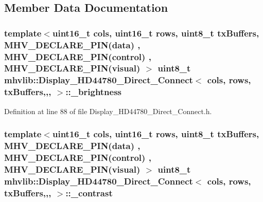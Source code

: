 \subsection{Member Data Documentation}
\hypertarget{classmhvlib_1_1_display___h_d44780___direct___connect_aba2e5cf89a0de2c24ee7a6dd1d5a9069}{
\subsubsection[{\-\_\-brightness}]{\setlength{\rightskip}{0pt plus 5cm}template$<$uint16\-\_\-t cols, uint16\-\_\-t rows, uint8\-\_\-t tx\-Buffers, M\-H\-V\-\_\-\-D\-E\-C\-L\-A\-R\-E\-\_\-\-P\-I\-N(data) , M\-H\-V\-\_\-\-D\-E\-C\-L\-A\-R\-E\-\_\-\-P\-I\-N(control) , M\-H\-V\-\_\-\-D\-E\-C\-L\-A\-R\-E\-\_\-\-P\-I\-N(visual) $>$ uint8\-\_\-t {\bf mhvlib\-::\-Display\-\_\-\-H\-D44780\-\_\-\-Direct\-\_\-\-Connect}$<$ cols, rows, tx\-Buffers,,, $>$\-::\-\_\-brightness\hspace{0.3cm}{\ttfamily [protected]}}}\label{classmhvlib_1_1_display___h_d44780___direct___connect_aba2e5cf89a0de2c24ee7a6dd1d5a9069}


Definition at line 88 of file Display\-\_\-\-H\-D44780\-\_\-\-Direct\-\_\-\-Connect.\-h.

\hypertarget{classmhvlib_1_1_display___h_d44780___direct___connect_a1872f4fa9a7ab8f11014ea8c5f8a74ba}{
\subsubsection[{\-\_\-contrast}]{\setlength{\rightskip}{0pt plus 5cm}template$<$uint16\-\_\-t cols, uint16\-\_\-t rows, uint8\-\_\-t tx\-Buffers, M\-H\-V\-\_\-\-D\-E\-C\-L\-A\-R\-E\-\_\-\-P\-I\-N(data) , M\-H\-V\-\_\-\-D\-E\-C\-L\-A\-R\-E\-\_\-\-P\-I\-N(control) , M\-H\-V\-\_\-\-D\-E\-C\-L\-A\-R\-E\-\_\-\-P\-I\-N(visual) $>$ uint8\-\_\-t {\bf mhvlib\-::\-Display\-\_\-\-H\-D44780\-\_\-\-Direct\-\_\-\-Connect}$<$ cols, rows, tx\-Buffers,,, $>$\-::\-\_\-contrast\hspace{0.3cm}{\ttfamily [protected]}}}\label{classmhvlib_1_1_display___h_d44780___direct___connect_a1872f4fa9a7ab8f11014ea8c5f8a74ba}


